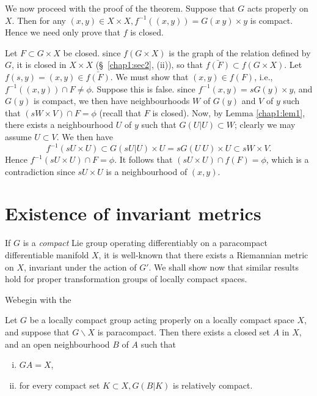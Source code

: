 We now proceed with the proof of the theorem. Suppose that $G$ acts
properly on $X$. Then for any $(x, y) \in X \times X, f^{-1}((x, y)) =
G(x~y)\times y$ is compact. Hence we need only prove that $f$ is
closed. 

Let $F \subset G \times X$ be closed. since $f(G \times X)$ is the
graph of the relation defined by $G$, it is closed in $X \times X$ (\S\
\ref{chap1:sec2}, (ii)), so that $\bar{f(F)} \subset f(G \times X)$. Let $f(s, y) =
(x, y)\in \bar{f(F)}$. We must  show that $(x, y)\in f(F)$,
i.e., $f^{-1}((x, y)) \cap F \neq \phi$. Suppose this is false. since
$f^{-1}(x, y) = sG(y) \times y$, and $G(y)$ is compact, we then have
neighbourhoods $W$ of $G(y)$ and $V$ of $y$ such that $(sW \times V)
\cap F = \phi$ (recall that $F$ is closed). Now, by Lemma \ref{chap1:lem1}, there
exists a neighbourhood $U$ of $y$ such that $G(U | U) \subset W$;
clearly we may assume $U \subset V$. We then have 
$$
f^{-1} (sU \times U) \subset G (sU | U) \times U = sG(U~U) \times U
\subset sW \times V. 
$$
Hence $f^{-1} (sU \times U) \cap F = \phi$. It follows that $(sU
\times U) \cap f(F) = \phi$, which is a contradiction since $sU \times
U$ is a neighbourhood of $(x, y)$. 

\section{Existence of invariant metrics}\label{chap1:sec4}%

If $G$ is a \textit{compact} Lie group operating differentiably on a
paracompact differentiable manifold $X$, it is well-known that there
exists a Riemannian metric on $X$, invariant under the action of
$G'$. We shall show now that similar results hold for proper
transformation groups of locally compact spaces. 

We\pageoriginale begin with the


\begin{lem}\label{chap1:lem2}%
Let $G$ be a locally compact group acting properly on a locally
compact space $X$, and suppose that $G \backslash X$ is
paracompact. Then there exists a closed set $A$ in $X$, and an open
neighbourhood $B$ of $A$ such that  
\begin{enumerate}[(i)]
\item $GA=X$,
\item for every compact set $K \subset X, G(B | K)$ is relatively compact.
\end{enumerate}
\end{lem}

